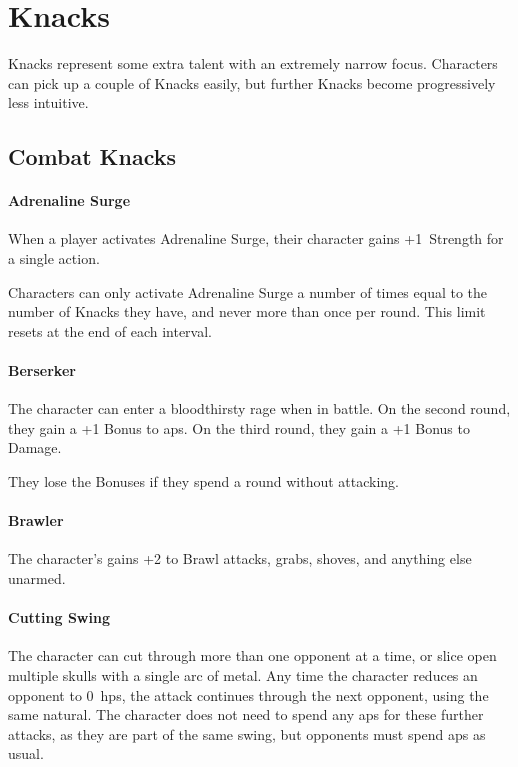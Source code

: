 \chapter[Hall of Knacks]{Knacks}
\label{knacks}

Knacks represent some extra talent with an extremely narrow focus.
Characters can pick up a couple of Knacks easily, but further Knacks become progressively less intuitive.

\section{Combat Knacks}

\begin{multicols}{2}

\subsubsection{Adrenaline Surge}
\label{adrenalinesurge}

When a player activates Adrenaline Surge, their character gains +1~Strength for a single action.

Characters can only activate Adrenaline Surge a number of times equal to the number of Knacks they have, and never more than once per round.
This limit resets at the end of each \gls{interval}.

\subsubsection{Berserker}

The character can enter a bloodthirsty rage when in battle.
On the second round, they gain a +1 Bonus to \glspl{ap}.
On the third round, they gain a +1 Bonus to Damage.

They lose the Bonuses if they spend a round without attacking.

\subsubsection{Brawler}

The character's gains +2 to Brawl attacks, grabs, shoves, and anything else unarmed.

\subsubsection{Cutting Swing}

The character can cut through more than one opponent at a time, or slice open multiple skulls with a single arc of metal.
Any time the character reduces an opponent to 0~\glspl{hp}, the attack continues through the next opponent, using the same \gls{natural}.
The character does not need to spend any \glspl{ap} for these further attacks, as they are part of the same swing, but opponents must spend \glspl{ap} as usual.


\end{multicols}
